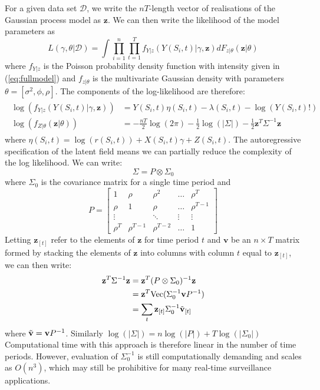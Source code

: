 For a given data set $\mathcal{D}$, we write the $nT$-length vector of realisations of the Gaussian process model as $\mathbf{z}$. We can then write the likelihood of the model parameters as
\begin{equation}
\label{eq:lgcplik}
    L(\gamma,\theta \vert \mathcal{D}) = \int \prod_{i=1}^n \prod_{t=1}^T f_{Y \vert z}(Y(S_i,t) \vert \gamma,\mathbf{z}) dF_{z\vert \theta }(\mathbf{z}\vert \theta)
\end{equation}
where $f_{Y\vert z}$ is the Poisson probability density function with intensity given in (\ref{eq:fullmodel}) and $f_{z\vert \theta}$ is the multivariate Gaussian density with parameters $\theta = [ \sigma^2, \phi, \rho ]$. The components of the log-likelihood are therefore:
\begin{align}
\begin{split}
\label{eq:mvnll}
    \log(f_{Y \vert z}(Y(S_i,t) \vert \gamma,\mathbf{z})) &= Y(S_i,t)\eta(S_i,t) - \lambda(S_i,t) - \log(Y(S_i,t)!) \\
    \log(f_{Z \vert \theta }(\mathbf{z} \vert \theta)) &= -\frac{nT}{2}\log{(2\pi)} - \frac{1}{2}\log(|\Sigma|) - \frac{1}{2}\mathbf{z}^T \Sigma^{-1} \mathbf{z}
\end{split}
\end{align}
where $\eta(S_i,t) = \log(r(S_i,t)) + X(S_i,t)\gamma + Z(S_i,t)$. The autoregressive specification of the latent field means we can partially reduce the complexity of the log likelihood. We can write:
\begin{equation*}
    \Sigma = P \otimes \Sigma_0
\end{equation*}
where $\Sigma_0$ is the covariance matrix for a single time period and 
\begin{equation*}
    P = \begin{bmatrix}
    1 & \rho & \rho^2 & \hdots & \rho^T \\
    \rho & 1 & \rho & \hdots & \rho^{T-1} \\
    \vdots & & \ddots & \vdots & \vdots \\
    \rho^T & \rho^{T-1} & \rho^{T-2} & \hdots & 1 
    \end{bmatrix}
\end{equation*}
Letting $\mathbf{z}_{[t]}$ refer to the elements of $\mathbf{z}$ for time period $t$ and $\mathbf{v}$ be an $n \times T$ matrix formed by stacking the elements of $\mathbf{z}$ into columns with column $t$ equal to $\mathbf{z}_{[t]}$, we can then write:
\begin{align*}
    \mathbf{z}^T \Sigma^{-1} \mathbf{z} &= \mathbf{z}^T (P \otimes \Sigma_0)^{-1} \mathbf{z}\\
    &= \mathbf{z}^T \text{Vec}(\Sigma_0^{-1}\mathbf{v}P^{-1}) \\
    &= \sum_t \mathbf{z}_{[t]} \Sigma_0^{-1} \Tilde{\mathbf{v}}_{[t]}
\end{align*}
where $\Tilde{\mathbf{v}} = \mathbf{v}P^{-1}$. Similarly $\log{(\vert \Sigma \vert)} = n\log{(\vert P \vert)} + T\log{(\vert \Sigma_0 \vert)}$ Computational time with this approach is therefore linear in the number of time periods. However, evaluation of $\Sigma_0^{-1}$ is still computationally demanding and scales as $O(n^3)$, which may still be prohibitive for many real-time surveillance applications. 

